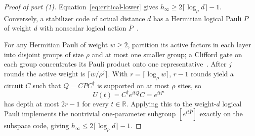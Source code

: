 \documentclass[aps,prl,reprint,notitlepage,nofootinbib,nobibnotes]{revtex4-2}
\begin{document}
\begin{proof}[Proof of part (1)]
Equation~\eqref{eq:critical-lower} gives \(h_\infty\ge2\lceil\log_\rho d\rceil-1\). Conversely, a stabilizer code of actual distance \(d\) has a Hermitian logical Pauli \(P\) of weight \(d\) with nonscalar logical action \(\overline P\)~\cite[Sec.~3.2]{GottesmanStabilizer}.

For any Hermitian Pauli of weight \(w\ge2\), partition its active factors in each layer into disjoint groups of size \(\rho\) and at most one smaller group; a Clifford gate on each group concentrates its Pauli product onto one representative~\cite{BonetMonroig,Cowtan,HaahLiuTan}. After \(j\) rounds the active weight is \(\lceil w/\rho^j\rceil\). With \(r=\lceil\log_\rho w\rceil\), \(r-1\) rounds yield a circuit \(C\) such that \(Q=CPC^\dagger\) is supported on at most \(\rho\) sites, so
\begin{equation}\label{eq:pauli-family}
 U(t)=C^\dagger e^{itQ}C=e^{itP}
\end{equation}
has depth at most \(2r-1\) for every \(t\in\mathbb R\). Applying this to the weight-\(d\) logical Pauli implements the nontrivial one-parameter subgroup \([e^{it\overline P}]\) exactly on the subspace code, giving \(h_\infty\le 2\lceil\log_\rho d\rceil-1\).
\end{proof}
\end{document}
